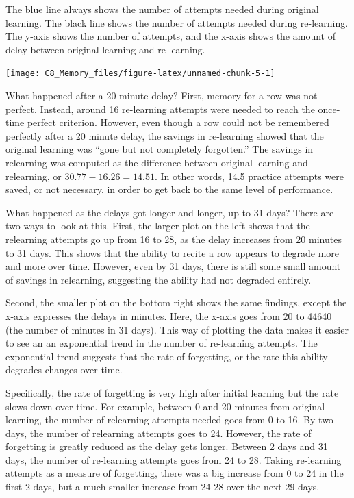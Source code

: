 \documentclass[
  oneside,
  12pt]{crumpbook}
\begin{document}
The blue line always shows the number of attempts needed during original learning. The black line shows the number of attempts needed during re-learning. The y-axis shows the number of attempts, and the x-axis shows the amount of delay between original learning and re-learning.

\texttt{[image: C8\_Memory\_files/figure-latex/unnamed-chunk-5-1]}

What happened after a 20 minute delay? First, memory for a row was not perfect. Instead, around 16 re-learning attempts were needed to reach the once-time perfect criterion. However, even though a row could not be remembered perfectly after a 20 minute delay, the savings in re-learning showed that the original learning was ``gone but not completely forgotten.'' The savings in relearning was computed as the difference between original learning and relearning, or \(30.77-16.26 = 14.51\). In other words, 14.5 practice attempts were saved, or not necessary, in order to get back to the same level of performance.

What happened as the delays got longer and longer, up to 31 days? There are two ways to look at this. First, the larger plot on the left shows that the relearning attempts go up from 16 to 28, as the delay increases from 20 minutes to 31 days. This shows that the ability to recite a row appears to degrade more and more over time. However, even by 31 days, there is still some small amount of savings in relearning, suggesting the ability had not degraded entirely.

Second, the smaller plot on the bottom right shows the same findings, except the x-axis expresses the delays in minutes. Here, the x-axis goes from 20 to 44640 (the number of minutes in 31 days). This way of plotting the data makes it easier to see an an exponential trend in the number of re-learning attempts. The exponential trend suggests that the rate of forgetting, or the rate this ability degrades changes over time.

Specifically, the rate of forgetting is very high after initial learning but the rate slows down over time. For example, between 0 and 20 minutes from original learning, the number of relearning attempts needed goes from 0 to 16. By two days, the number of relearning attempts goes to 24. However, the rate of forgetting is greatly reduced as the delay gets longer. Between 2 days and 31 days, the number of re-learning attempts goes from 24 to 28. Taking re-learning attempts as a measure of forgetting, there was a big increase from 0 to 24 in the first 2 days, but a much smaller increase from 24-28 over the next 29 days.
\end{document}

